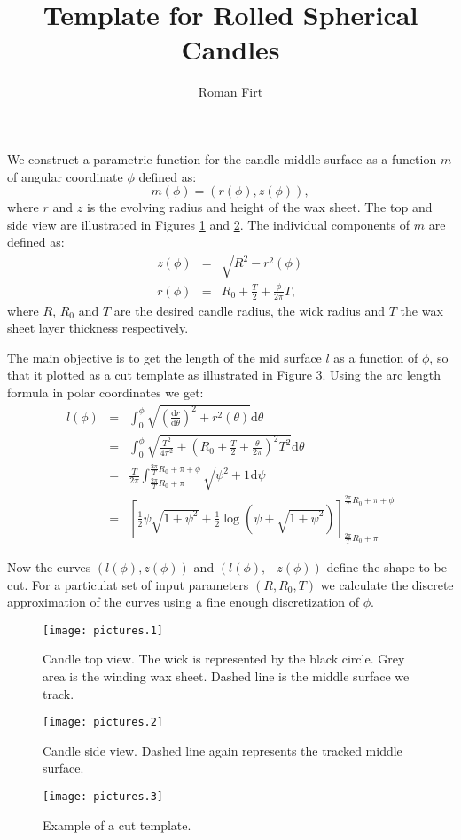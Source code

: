 \documentclass[a4paper,10pt]{article}
\title{Template for Rolled Spherical Candles}
\author{Roman Firt}
\begin{document}
\maketitle

We construct a parametric function for the candle middle surface as a function $m$ of angular coordinate $\phi$ defined as:
$$m(\phi)=(r(\phi), z(\phi)),$$
where $r$ and $z$ is the evolving radius and height of the wax sheet. The top and side view are illustrated in Figures \ref{topview} and \ref{sideview}. The individual components of $m$ are defined as:
\begin{eqnarray}
z(\phi)&=&\sqrt{R^2-r^2(\phi)}\\
r(\phi)&=&R_0+\frac{T}{2}+\frac{\phi}{2\pi}T,
\end{eqnarray}
where $R$, $R_0$ and $T$ are the desired candle radius, the wick radius and $T$ the wax sheet layer thickness respectively.

The main objective is to get the length of the mid surface $l$ as a function of $\phi$, so that it plotted as a cut template as illustrated in Figure \ref{cuttemplate}. Using the arc length formula in polar coordinates we get:
\begin{eqnarray}
l(\phi)&=&\int_0^{\phi}\sqrt{\left(\frac{\mathrm{d}r}{\mathrm{d}\theta}\right)^2+r^2(\theta)}\mathrm{d}\theta\\
&=&\int_0^{\phi}\sqrt{\frac{T^2}{4\pi^2}+\left(R_0+\frac{T}{2}+\frac{\theta}{2\pi}\right)^2T^2}\mathrm{d}\theta\\
&=&\frac{T}{2\pi}\int_{\frac{2\pi}{T}R_0+\pi}^{\frac{2\pi}{T}R_0+\pi+\phi}\sqrt{\psi^2+1}\mathrm{d}\psi\\
&=&\left[\frac{1}{2}\psi\sqrt{1+\psi^2}+\frac{1}{2}\log\left(\psi+\sqrt{1+\psi^2}\right)\right]_{\frac{2\pi}{T}R_0+\pi}^{\frac{2\pi}{T}R_0+\pi+\phi}
\end{eqnarray}

Now the curves $\left(l(\phi), z(\phi)\right)$ and $\left(l(\phi), -z(\phi)\right)$ define the shape to be cut. For a particulat set of input parameters $(R, R_0, T)$ we calculate the discrete approximation of the curves using a fine enough discretization of $\phi$.

\begin{figure}
\centering
\texttt{[image: pictures.1]}
\caption{Candle top view. The wick is represented by the black circle. Grey area is the winding wax sheet. Dashed line is the middle surface we track.}
\label{topview}
\end{figure}

\begin{figure}
\centering
\texttt{[image: pictures.2]}
\caption{Candle side view. Dashed line again represents the tracked middle surface.}
\label{sideview}
\end{figure} 

\begin{figure}
\centering
\texttt{[image: pictures.3]}
\caption{Example of a cut template.}
\label{cuttemplate}
\end{figure} 
\end{document}
